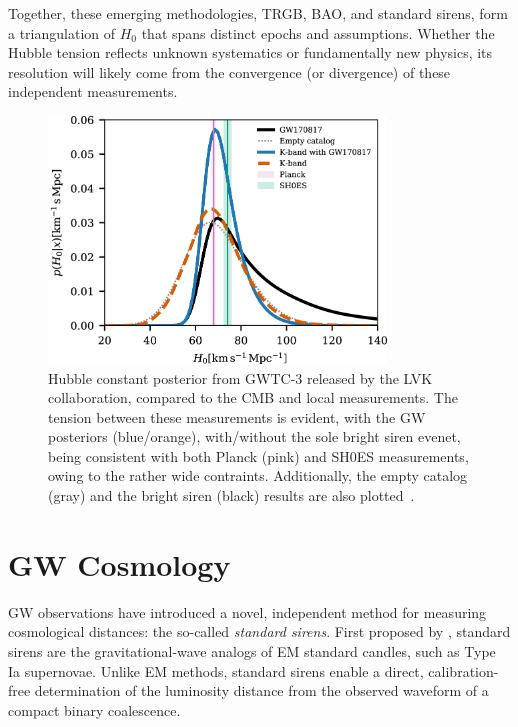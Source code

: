 Together, these emerging methodologies, TRGB, BAO, and standard sirens, form a triangulation of $H_0$ that spans distinct epochs and assumptions. Whether the Hubble tension reflects unknown systematics or fundamentally new physics, its resolution will likely come from the convergence (or divergence) of these independent measurements.

\begin{figure}[h!]
    \centering
    \includegraphics[width=0.8\textwidth]{figures/apjac74bbf9_hr.jpg}
    \caption[Hubble tension and standard sirens]{Hubble constant posterior from \ac{GWTC}-3 released by the \ac{LVK} collaboration, compared to the \ac{CMB} and local measurements. The tension between these measurements is evident, with the \ac{GW} posteriors (blue/orange), with/without the sole bright siren evenet, being consistent with both Planck (pink) and \ac{SH0ES} measurements, owing to the rather wide contraints. Additionally, the empty catalog (gray) and the bright siren (black) results are also plotted~\citep{abbott2023constraints}.}
    \label{fig:hubble_tension_gw}
\end{figure}


\section{\ac{GW} Cosmology}
\ac{GW} observations have introduced a novel, independent method for measuring cosmological distances: the so-called \textit{standard sirens}. First proposed by \citet{schutz1986determining}, standard sirens are the gravitational-wave analogs of \ac{EM} standard candles, such as Type Ia supernovae. Unlike \ac{EM} methods, standard sirens enable a direct, calibration-free determination of the luminosity distance from the observed waveform of a compact binary coalescence.

